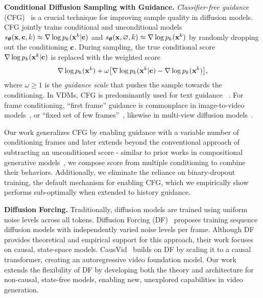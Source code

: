 \textbf{Conditional Diffusion Sampling with Guidance.} \emph{Classifier-free guidance} (CFG)~\cite{ho2022classifierfree} is a crucial technique for improving sample quality in diffusion models. CFG jointly trains conditional and unconditional models $s_{\bm{\theta}}({\mathbf{x}}, {\mathbf{c}}, k) \approx {\nabla \log\,} p_k({\mathbf{x}}^k | {\mathbf{c}})$ and $s_{\bm{\theta}}({\mathbf{x}}, \varnothing, k) \approx {\nabla \log\,} p_k({\mathbf{x}}^k)$ by randomly dropping out the conditioning ${\mathbf{c}}$. During sampling, the true conditional score ${\nabla \log\,} p_k({\mathbf{x}}^k | {\mathbf{c}})$ is replaced with the weighted score
\vspace{-4pt}
\begin{equation}
\score p_k(\bx^k) + \omega \big[ \score p_k(\bx^k | \rvc) - \score p_k(\bx^k) \big],
\vspace{-4pt}
\end{equation}
where $\omega \geq 1$ is the \emph{guidance scale} that pushes the sample towards the conditioning. In VDMs, CFG is predominantly used for text guidance ~\cite{ho2022video,wang2023modelscope}. For frame conditioning, ``first frame'' guidance is commonplace in image-to-video models~\cite{blattmann2023stable,yang2024cogvideox}, or ``fixed set of few frames''~\cite{blattmann2023align,gupta2023photorealistic,watson2024controlling}, likewise in multi-view diffusion models~\cite{gao2024cat3d}. 

Our work generalizes CFG by enabling guidance with a variable number of conditioning frames and later extends beyond the conventional approach of subtracting an unconditioned score - similar to prior works in compositional generative models~\cite{du2024compositional, liu2022compositional, du2023reduce}, we compose score from multiple conditioning to combine their behaviors. Additionally, we eliminate the reliance on binary-dropout training, the default mechanism for enabling CFG, which we empirically show performs sub-optimally when extended to history guidance.


\textbf{Diffusion Forcing.}  Traditionally, diffusion models are trained using uniform noise levels across all tokens. Diffusion Forcing (DF)~\cite{chen2024diffusion} proposes training sequence diffusion models with independently varied noise levels per frame. Although DF provides theoretical and empirical support for this approach, their work focuses on causal, state-space models. CausVid~\cite{yin2024slow} builds on DF by scaling it to a causal transformer, creating an autoregressive video foundation model. Our work extends the flexibility of DF by developing both the theory and architecture for non-causal, state-free models, enabling new, unexplored capabilities in video generation.


